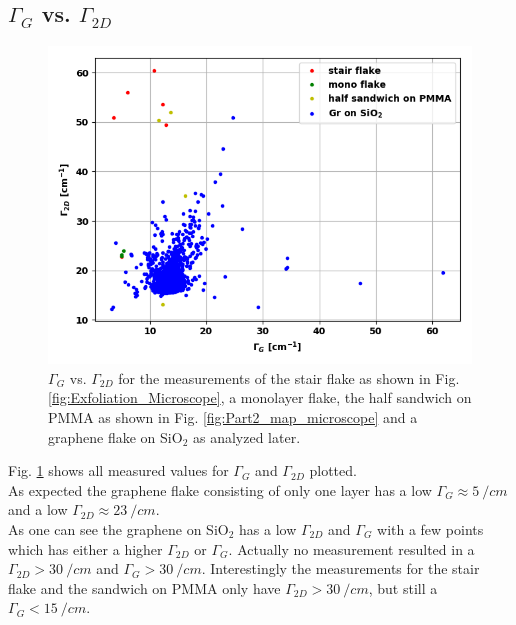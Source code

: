 \documentclass[12pt,a4paper]{article}
\begin{document}
\subsection{$\Gamma _G$ vs. $\Gamma _{2D}$}


\begin{figure}
\centering
\includegraphics[scale=0.55]{Bilder/Part_3/gamma_2D_vs_G.PNG}
\caption{$\Gamma _G$ vs. $\Gamma _{2D}$ for the measurements of the stair flake as shown in Fig. \ref{fig:Exfoliation_Microscope}, a monolayer flake, the half sandwich on PMMA as shown in Fig. \ref{fig:Part2_map_microscope} and a graphene flake on SiO$_2$ as analyzed later.}
\label{fig:Part3_gamma_G_vs_2D}
\end{figure}

Fig. \ref{fig:Part3_gamma_G_vs_2D} shows all measured values for $\Gamma _G$ and $\Gamma _{2D}$ plotted. \\ 
As expected the graphene flake consisting of only one layer has a low $\Gamma _G \approx \SI{5}{\per cm}$ and a low $\Gamma _{2D} \approx \SI{23}{\per cm}$. \\
As one can see the graphene on SiO$_2$ has a low $\Gamma _{2D}$ and $\Gamma _G$ with a few points which has either a higher $\Gamma _{2D}$ or $\Gamma _G$. Actually no measurement resulted in a $\Gamma _{2D} > \SI{30}{\per cm}$ and $\Gamma _G > \SI{30}{\per cm}$. Interestingly the measurements for the stair flake and the sandwich on PMMA only have $\Gamma _{2D} > \SI{30}{\per cm}$, but still a $\Gamma _G < \SI{15}{\per cm}$.
\end{document}
